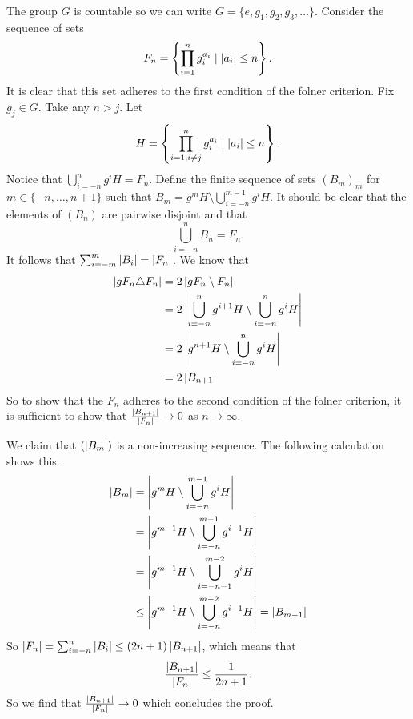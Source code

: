 The group $G$ is countable so we can write $G = \{e, g_1, g_2, g_3, \dots\}$.
Consider the sequence of sets $$F_n = \left\{\prod_{i = 1}^n g_i^{a_i} \mid \left| a_i \right| \le n\right\}.$$ 
It is clear that this set adheres to the first condition of the folner criterion. 
Fix $g_j \in G$. Take any $n > j$.
Let $$H = \left\{\prod_{i = 1, i \ne j}^n g_i^{a_i} \mid \left| a_i \right| \le n\right\}.$$
Notice that $\bigcup_{i = -n}^{n} g^{i}H = F_n$.
Define the finite sequence of sets $(B_m)_m$ for $m \in \{-n, \dots, n+1\}$ such that  
$B_m = g^mH \setminus \bigcup_{i=-n}^{m-1}g^iH$.
It should be clear that the elements of $(B_n)$ are pairwise disjoint and that  \[
    \bigcup_{i = -n}^n B_n = F_n 
.\] 
It follows that $\sum_{i=-m}^{m} \left| B_i \right| = \left| F_n \right|$. We know that 
\begin{align*}
    \left| gF_n \triangle F_n \right| &= 2 \left| gF_n \setminus F_n \right| \\
    &= 2 \left| \bigcup_{i = -n}^n g^{i+1}H \setminus \bigcup_{i = -n}^n g^{i}H \right|\\
    &=  2 \left| g^{n+1}H \setminus \bigcup_{i = -n}^n g^{i}H \right|\\
    &= 2 \left| B_{n+1} \right|
\end{align*}
So to show that the $F_n$ adheres to the second condition of the folner criterion, it is sufficient to show that $\frac{\left| B_{n+1} \right|}{\left| F_n \right|} \to 0$ as $n \to \infty$.

We claim that $(\left| B_m \right|)$ is a non-increasing sequence. The following calculation shows this.
\begin{align*}
    \left| B_m \right| &= \left| g^{m}H \setminus \bigcup_{i=-n}^{m-1}g^iH \right|\\
    &= \left| g^{m-1}H \setminus \bigcup_{i=-n}^{m-1}g^{i-1}H \right|\\
    &= \left| g^{m-1}H \setminus \bigcup_{i=-n-1}^{m-2}g^{i}H \right|\\
    &\le \left| g^{m-1}H \setminus \bigcup_{i=-n}^{m-2}g^{i-1}H \right| = \left| B_{m-1} \right|
\end{align*}
So $\left| F_n \right| = \sum_{i=-n}^{n} \left| B_i \right| \le (2n+1) \left| B_{n+1} \right|$, which means that $$\frac{\left| B_{n+1} \right|}{\left| F_n \right|} \le \frac{1}{2n+1}.$$
So we find that $\frac{\left| B_{n+1} \right|}{\left| F_n \right|} \to 0$ which concludes the proof. 